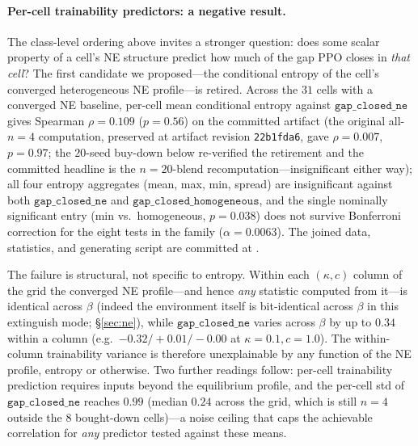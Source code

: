 \documentclass{anvil-paper}
\begin{document}
\paragraph{Per-cell trainability predictors: a negative result.}
The class-level ordering above invites a stronger question: does some
scalar property of a cell's NE structure predict how much of the gap PPO
closes in \emph{that cell}? The first candidate we proposed---the
conditional entropy of the cell's converged heterogeneous NE
profile---is retired. Across the $31$ cells with a converged NE
baseline, per-cell mean conditional entropy against
$\texttt{gap\_closed\_ne}$ gives Spearman $\rho{=}0.109$ ($p{=}0.56$) on
the committed artifact (the original all-$n{=}4$ computation, preserved
at artifact revision \texttt{22b1fda6}, gave $\rho{=}0.007$, $p{=}0.97$;
the $20$-seed buy-down below re-verified the retirement and the
committed headline is the $n{=}20$-blend recomputation---insignificant
either way); all four entropy aggregates (mean, max, min, spread) are
insignificant against both $\texttt{gap\_closed\_ne}$ and
$\texttt{gap\_closed\_homogeneous}$, and the single nominally
significant entry (min vs.\ homogeneous, $p{=}0.038$) does not
survive Bonferroni correction for the eight tests in the family
($\alpha{=}0.0063$). The joined data, statistics, and generating script
are committed at
.

The failure is structural, not specific to entropy. Within each
$(\kappa,c)$ column of the grid the converged NE profile---and hence
\emph{any} statistic computed from it---is identical across $\beta$
(indeed the environment itself is bit-identical across $\beta$ in this
extinguish mode; \S\ref{sec:ne}), while
$\texttt{gap\_closed\_ne}$ varies across $\beta$ by up to $0.34$ within
a column (e.g.\ $-0.32/+0.01/-0.00$ at $\kappa{=}0.1,c{=}1.0$). The
within-column trainability variance is therefore unexplainable by any
function of the NE profile, entropy or otherwise. Two further readings
follow: per-cell trainability prediction requires inputs beyond the
equilibrium profile, and the per-cell std of
$\texttt{gap\_closed\_ne}$ reaches $0.99$ (median $0.24$ across the
grid, which is still $n{=}4$ outside the $8$ bought-down cells)---a
noise ceiling that caps the achievable correlation for \emph{any}
predictor tested against these means.
\end{document}
